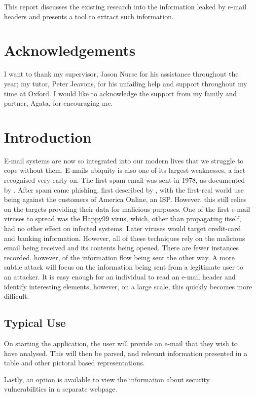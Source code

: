 \documentclass[10pt]{report}
\begin{document}
This report discusses the existing research into the information leaked by e-mail headers and presents a tool to extract such information.

\chapter*{Acknowledgements}
I want to thank my supervisor, Jason Nurse for his assistance throughout the year; my tutor, Peter Jeavons, for his unfailing help and support throughout my time at Oxford.  I would like to acknowledge the support from my family and partner, Agata, for encouraging me.

\tableofcontents
\chapter{Introduction}
E-mail systems are now so integrated into our modern lives that we struggle to cope without them.  E-mails ubiquity is also one of its largest weaknesses, a fact recognised very early on.  The first spam email was sent in 1978, as documented by \cite{templeton}.  After spam came phishing, first described by \cite{felix1987system}, with the first-real world use being against the customers of America Online, an ISP.  However, this still relies on the targets providing their data for malicious purposes.  One of the first e-mail viruses to spread was the Happy99 virus, which, other than propagating itself, had no other effect on infected systems.  Later viruses would target credit-card and banking information.  However, all of these techniques rely on the malicious email being received and its contents being opened.  There are fewer instances recorded, however, of the information flow being sent the other way.  A more subtle attack will focus on the information being sent from a legitimate user to an attacker.  It is easy enough for an individual to read an e-mail header and identify interesting elements, however, on a large scale, this quickly becomes more difficult.

\section{Typical Use}

On starting the application, the user will provide an e-mail that they wish to have analysed.  This will then be parsed, and relevant information presented in a table and other pictoral based representations.

Lastly, an option is available to view the information about security vulnerabilities in a separate webpage.
\end{document}
